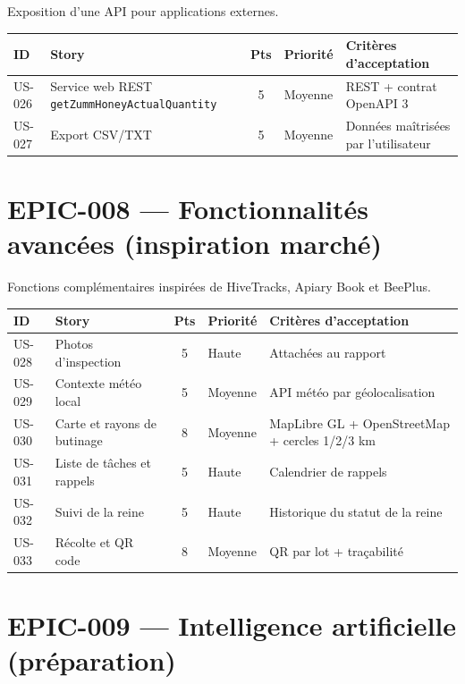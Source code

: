 Exposition d'une API pour applications externes.

\begin{center}
\begin{tabular}{lp{6.6cm}cl p{4.6cm}}
\toprule
\textbf{ID} & \textbf{Story} & \textbf{Pts} & \textbf{Priorité} & \textbf{Critères d'acceptation} \\
\midrule
US-026 & Service web REST \texttt{getZummHoneyActualQuantity} & 5 & Moyenne & REST + contrat OpenAPI 3 \\
US-027 & Export CSV/TXT & 5 & Moyenne & Données maîtrisées par l'utilisateur \\
\bottomrule
\end{tabular}
\end{center}

\section{EPIC-008 --- Fonctionnalités avancées (inspiration marché)}

Fonctions complémentaires inspirées de HiveTracks, Apiary Book et BeePlus.

\begin{center}
\begin{tabular}{lp{6.6cm}cl p{4.6cm}}
\toprule
\textbf{ID} & \textbf{Story} & \textbf{Pts} & \textbf{Priorité} & \textbf{Critères d'acceptation} \\
\midrule
US-028 & Photos d'inspection            & 5 & Haute   & Attachées au rapport \\
US-029 & Contexte météo local           & 5 & Moyenne & API météo par géolocalisation \\
US-030 & Carte et rayons de butinage    & 8 & Moyenne & MapLibre GL + OpenStreetMap + cercles 1/2/3 km \\
US-031 & Liste de tâches et rappels     & 5 & Haute   & Calendrier de rappels \\
US-032 & Suivi de la reine              & 5 & Haute   & Historique du statut de la reine \\
US-033 & Récolte et QR code             & 8 & Moyenne & QR par lot + traçabilité \\
\bottomrule
\end{tabular}
\end{center}

\section{EPIC-009 --- Intelligence artificielle (préparation)}

